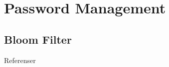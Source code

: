 \documentclass{beamer}
\begin{document}
\section{Password Management}
%
%
%
%
%
%
%
%

\subsection{Bloom Filter}

\begin{frame}{\insertsubsectionhead}
\end{frame}




\begin{frame}[allowframebreaks]{Referenser}
	\small
  \printbibliography
\end{frame}
\end{document}
